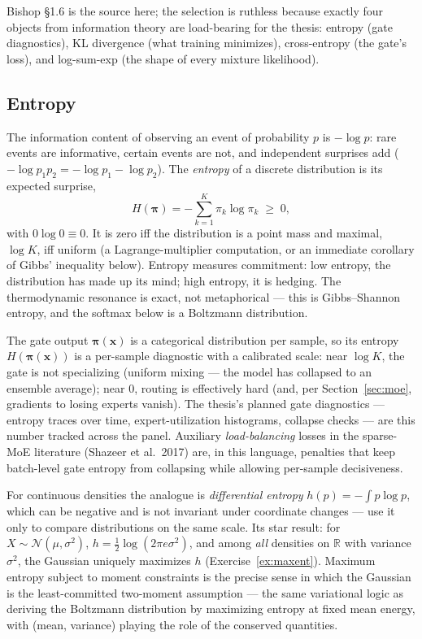 \documentclass[11pt]{article}
\numberwithin{equation}{section}
\theoremstyle{plain}
\theoremstyle{definition}
\theoremstyle{remark}
\newcommand{\Normal}{\mathcal{N}}
\newcommand{\R}{\mathbb{R}}
\newcommand{\x}{\bm{x}}
\begin{document}
Bishop \S1.6 is the source here; the selection is ruthless because exactly four objects from information theory are load-bearing for the thesis: entropy (gate diagnostics), KL divergence (what training minimizes), cross-entropy (the gate's loss), and log-sum-exp (the shape of every mixture likelihood).

\subsection{Entropy}

The information content of observing an event of probability $p$ is $-\log p$: rare events are informative, certain events are not, and independent surprises add ($-\log p_1 p_2 = -\log p_1 - \log p_2$). The \emph{entropy} of a discrete distribution is its expected surprise,
\begin{equation}
H(\bm{\pi}) = -\sum_{k=1}^K \pi_k \log \pi_k \;\ge\; 0,
\end{equation}
with $0 \log 0 \equiv 0$. It is zero iff the distribution is a point mass and maximal, $\log K$, iff uniform (a Lagrange-multiplier computation, or an immediate corollary of Gibbs' inequality below). Entropy measures commitment: low entropy, the distribution has made up its mind; high entropy, it is hedging. The thermodynamic resonance is exact, not metaphorical --- this is Gibbs--Shannon entropy, and the softmax below is a Boltzmann distribution.

\begin{necbox}
The gate output $\bm{\pi}(\x)$ is a categorical distribution per sample, so its entropy $H(\bm{\pi}(\x))$ is a per-sample diagnostic with a calibrated scale: near $\log K$, the gate is not specializing (uniform mixing --- the model has collapsed to an ensemble average); near $0$, routing is effectively hard (and, per Section~\ref{sec:moe}, gradients to losing experts vanish). The thesis's planned gate diagnostics --- entropy traces over time, expert-utilization histograms, collapse checks --- are this number tracked across the panel. Auxiliary \emph{load-balancing} losses in the sparse-MoE literature (Shazeer et al.\ 2017) are, in this language, penalties that keep batch-level gate entropy from collapsing while allowing per-sample decisiveness.
\end{necbox}

For continuous densities the analogue is \emph{differential entropy} $h(p) = -\int p \log p$, which can be negative and is not invariant under coordinate changes --- use it only to compare distributions on the same scale. Its star result: for $X \sim \Normal(\mu, \sigma^2)$, $h = \tfrac12 \log(2\pi e \sigma^2)$, and among \emph{all} densities on $\R$ with variance $\sigma^2$, the Gaussian uniquely maximizes $h$ (Exercise~\ref{ex:maxent}). Maximum entropy subject to moment constraints is the precise sense in which the Gaussian is the least-committed two-moment assumption --- the same variational logic as deriving the Boltzmann distribution by maximizing entropy at fixed mean energy, with (mean, variance) playing the role of the conserved quantities.
\end{document}
